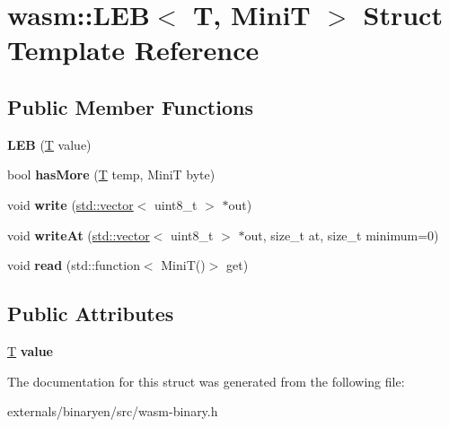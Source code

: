 \hypertarget{structwasm_1_1_l_e_b}{}\section{wasm\+:\+:L\+EB$<$ T, MiniT $>$ Struct Template Reference}
\label{structwasm_1_1_l_e_b}
\subsection*{Public Member Functions}
\begin{DoxyCompactItemize}
\item 
\mbox{\label{structwasm_1_1_l_e_b_aa3ce2b1005db165b0103d75574e4ab69}} 
{\bfseries L\+EB} (\mbox{\hyperlink{struct_t}{T}} value)
\item 
\mbox{\label{structwasm_1_1_l_e_b_a7a19d9efbed6f74261508fe8de75eccc}} 
bool {\bfseries has\+More} (\mbox{\hyperlink{struct_t}{T}} temp, MiniT byte)
\item 
\mbox{\label{structwasm_1_1_l_e_b_a0f4a2a55f971aff3dd91dc3c0a22caad}} 
void {\bfseries write} (\mbox{\hyperlink{classstd_1_1vector}{std\+::vector}}$<$ uint8\+\_\+t $>$ $\ast$out)
\item 
\mbox{\label{structwasm_1_1_l_e_b_ac44449f7c8bb60aabc1d092d675ed582}} 
void {\bfseries write\+At} (\mbox{\hyperlink{classstd_1_1vector}{std\+::vector}}$<$ uint8\+\_\+t $>$ $\ast$out, size\+\_\+t at, size\+\_\+t minimum=0)
\item 
\mbox{\label{structwasm_1_1_l_e_b_a92b070d90fb399bd09698048f3863267}} 
void {\bfseries read} (std\+::function$<$ MiniT()$>$ get)
\end{DoxyCompactItemize}
\subsection*{Public Attributes}
\begin{DoxyCompactItemize}
\item 
\mbox{\label{structwasm_1_1_l_e_b_a7365538d2a0db63bbce826ae268c9951}} 
\mbox{\hyperlink{struct_t}{T}} {\bfseries value}
\end{DoxyCompactItemize}


The documentation for this struct was generated from the following file\+:\begin{DoxyCompactItemize}
\item 
externals/binaryen/src/wasm-\/binary.\+h\end{DoxyCompactItemize}
